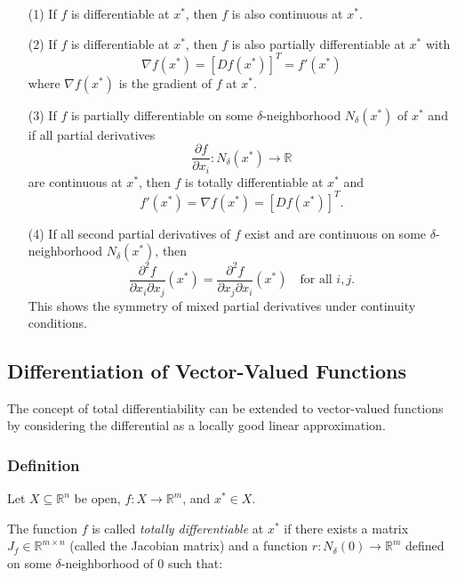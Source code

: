 \documentclass{article}
\begin{document}
\begin{enumerate}
    \item[(1)] If \( f \) is differentiable at \( x^* \), then \( f \) is also continuous at \( x^* \).
    
    \item[(2)] If \( f \) is differentiable at \( x^* \), then \( f \) is also partially differentiable at \( x^* \) with
    \[
    \nabla f(x^*) = [Df(x^*)]^T = f'(x^*)
    \]
    where \( \nabla f(x^*) \) is the gradient of \( f \) at \( x^* \).
    
    \item[(3)] If \( f \) is partially differentiable on some \(\delta\)-neighborhood \( N_\delta(x^*) \) of \( x^* \) and if all partial derivatives
    \[
    \frac{\partial f}{\partial x_i} : N_\delta(x^*) \rightarrow \mathbb{R}
    \]
    are continuous at \( x^* \), then \( f \) is totally differentiable at \( x^* \) and
    \[
    f'(x^*) = \nabla f(x^*) = [Df(x^*)]^T.
    \]
    
    \item[(4)] If all second partial derivatives of \( f \) exist and are continuous on some \(\delta\)-neighborhood \( N_\delta(x^*) \), then
    \[
    \frac{\partial^2 f}{\partial x_i \partial x_j} (x^*) = \frac{\partial^2 f}{\partial x_j \partial x_i} (x^*) \quad \text{for all } i,j.
    \]
    This shows the symmetry of mixed partial derivatives under continuity conditions.
\end{enumerate}
\subsection{Differentiation of Vector-Valued Functions}

The concept of total differentiability can be extended to vector-valued functions by considering the differential as a locally good linear approximation.

\subsubsection*{Definition}

Let \( X \subseteq \mathbb{R}^n \) be open, \( f: X \rightarrow \mathbb{R}^m \), and \( x^* \in X \).

The function \( f \) is called \textit{totally differentiable} at \( x^* \) if there exists a matrix \( J_f \in \mathbb{R}^{m \times n} \) (called the Jacobian matrix) and a function \( r: N_\delta(0) \rightarrow \mathbb{R}^m \) defined on some \(\delta\)-neighborhood of 0 such that:
\end{document}
